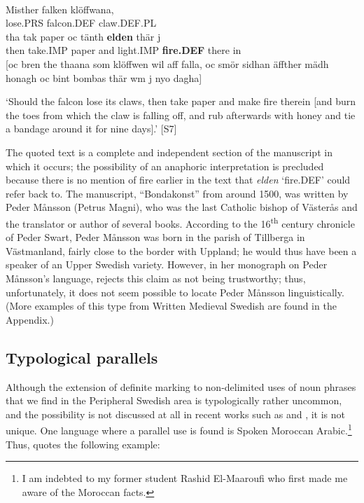 \ea \label{} 
\\
\gll Misther  falken  klöffwana,\\
lose.PRS  falcon.DEF  claw.DEF.PL\\
\gll tha  tak  paper  oc  tänth  \textbf{elden}  thär  j\\
then  take.IMP  paper  and  light.IMP  \textbf{fire.DEF} there   in\\
[oc bren the thaana som klöffwen wil aff falla, oc smör sidhan äffther mädh honagh oc bint bombas thär wm j nyo dagha]


\glt ‘Should the falcon lose its claws, then take paper and make fire therein [and burn the toes from which the claw is falling off, and rub afterwards with honey and tie a bandage around it for nine days].’ [S7]

\z

The quoted text is a complete and independent section of the manuscript in which it occurs; the possibility of an anaphoric interpretation is precluded because there is no mention of fire earlier in the text that \textit{elden} ‘fire.DEF’ could refer back to. The manuscript, “Bondakonst” from around 1500, was written by Peder Månsson (Petrus Magni), who was the last Catholic bishop of Västerås and the translator or author of several books. According to the 16\textsuperscript{th} century chronicle of Peder Swart, Peder Månsson was born in the parish of Tillberga in Västmanland, fairly close to the border with Uppland; he would thus have been a speaker of an Upper Swedish variety. However, in her monograph on Peder Månsson’s language, \citet[51]{Nordling2001} rejects this claim as not being trustworthy; thus, unfortunately, it does not seem possible to locate Peder Månsson linguistically. (More examples of this type from Written Medieval Swedish are found in the Appendix.) 

\subsection{ Typological parallels}
\label{bkm:Ref134937864}

Although the extension of definite marking to non-delimited uses of noun phrases that we find in the Peripheral Swedish area is typologically rather uncommon, and the possibility is not discussed at all in recent works such as \citet{Himmelmann1997} and \citet{Lyons1999}, it is not unique. One language where a parallel use is found is Spoken Moroccan Arabic.\footnote{ I am indebted to my former student Rashid El-Maaroufi who first made me aware of the Moroccan facts. } Thus, \citet[235]{Caubet1983} quotes the following example:

